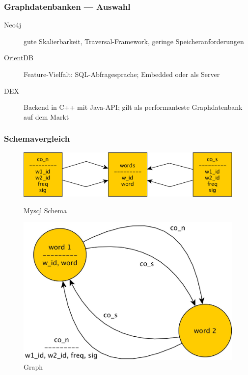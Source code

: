 \documentclass{beamer}
\begin{document}
\begin{frame}\frametitle{Graphdatenbanken --- Auswahl}
	\begin{description}
		\item[Neo4j] gute Skalierbarkeit, Traversal-Framework, geringe Speicheranforderungen
		\item[OrientDB] Feature-Vielfalt: SQL-Abfragesprache; Embedded oder als Server
		\item[DEX] Backend in C++ mit Java-API; gilt als performanteste Graphdatenbank auf dem Markt
	\end{description}
\end{frame}

\begin{frame}\frametitle{Schemavergleich}
\begin{figure}[ht]
\begin{minipage}[b]{0.45\linewidth}
\centering
\includegraphics[scale=0.03]{images/mysql_schema}
\caption{Mysql Schema}
\label{fig:mysql_schema}
\end{minipage}
\hspace{0.5cm}
\begin{minipage}[b]{0.45\linewidth}
\centering
\includegraphics[scale=0.1]{images/graph_schema}
\caption{Graph}
\label{fig:graph_schema}
\end{minipage}
\end{figure}
\end{frame}
\end{document}
